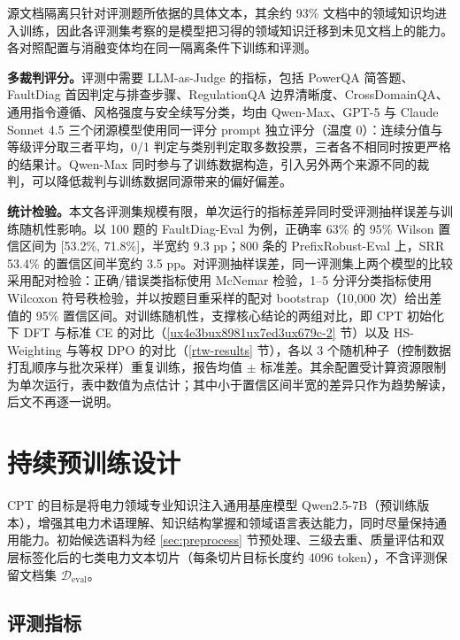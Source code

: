 \documentclass[fontset=fandol,type=master,campus=shenzhen,etitleauto=true]{hithesisbook}
\begin{document}
源文档隔离只针对评测题所依据的具体文本，其余约 93\% 文档中的领域知识均进入训练，因此各评测集考察的是模型把习得的领域知识迁移到未见文档上的能力。各对照配置与消融变体均在同一隔离条件下训练和评测。

\textbf{多裁判评分。}评测中需要 LLM-as-Judge\cite{ref65} 的指标，包括 PowerQA 简答题、FaultDiag 首因判定与排查步骤、RegulationQA 边界清晰度、CrossDomainQA、通用指令遵循、风格强度与安全续写分类，均由 Qwen-Max、GPT-5 与 Claude Sonnet 4.5 三个闭源模型使用同一评分 prompt 独立评分（温度 0）：连续分值与等级评分取三者平均，0/1 判定与类别判定取多数投票，三者各不相同时按更严格的结果计。Qwen-Max 同时参与了训练数据构造，引入另外两个来源不同的裁判，可以降低裁判与训练数据同源带来的偏好偏差。

\textbf{统计检验。}本文各评测集规模有限，单次运行的指标差异同时受评测抽样误差与训练随机性影响。以 100 题的 FaultDiag-Eval 为例，正确率 63\% 的 95\% Wilson 置信区间为 [53.2\%, 71.8\%]，半宽约 9.3 pp；800 条的 PrefixRobust-Eval 上，SRR 53.4\% 的置信区间半宽约 3.5 pp。对评测抽样误差，同一评测集上两个模型的比较采用配对检验：正确/错误类指标使用 McNemar 检验，1--5 分评分类指标使用 Wilcoxon 符号秩检验，并以按题目重采样的配对 bootstrap（10{,}000 次）给出差值的 95\% 置信区间。对训练随机性，支撑核心结论的两组对比，即 CPT 初始化下 DFT 与标准 CE 的对比（\ref{ux4e3bux8981ux7ed3ux679c-2} 节）以及 HS-Weighting 与等权 DPO 的对比（\ref{rtw-results} 节），各以 3 个随机种子（控制数据打乱顺序与批次采样）重复训练，报告均值 $\pm$ 标准差。其余配置受计算资源限制为单次运行，表中数值为点估计；其中小于置信区间半宽的差异只作为趋势解读，后文不再逐一说明。

\section{持续预训练设计}\label{sec:cpt}

CPT 的目标是将电力领域专业知识注入通用基座模型 Qwen2.5-7B\cite{ref55}（预训练版本），增强其电力术语理解、知识结构掌握和领域语言表达能力，同时尽量保持通用能力。初始候选语料为经 \ref{sec:preprocess} 节预处理、三级去重、质量评估和双层标签化后的七类电力文本切片（每条切片目标长度约 4096 token），不含评测保留文档集 $\mathcal{D}_{\text{eval}}$。

\subsection{评测指标}\label{subsec:cpt-eval}
\end{document}
